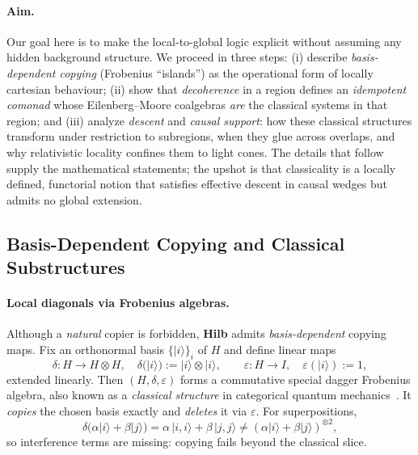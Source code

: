 \documentclass[11pt]{article}
\theoremstyle{upright}
\begin{document}
\paragraph{Aim.}
Our goal here is to make the local-to-global logic explicit without assuming any hidden background structure. We proceed in three steps: (i) describe \emph{basis-dependent copying} (Frobenius ``islands'') as the operational form of locally cartesian behaviour; (ii) show that \emph{decoherence} in a region defines an \emph{idempotent comonad} whose Eilenberg--Moore coalgebras \emph{are} the classical systems in that region; and (iii) analyze \emph{descent} and \emph{causal support}: how these classical structures transform under restriction to subregions, when they glue across overlaps, and why relativistic locality confines them to light cones. The details that follow supply the mathematical statements; the upshot is that classicality is a locally defined, functorial notion that satisfies effective descent in causal wedges but admits no global extension.

\subsection{Basis-Dependent Copying and Classical Substructures}

\paragraph{Local diagonals via Frobenius algebras.}
Although a \emph{natural} copier is forbidden, \textbf{Hilb} admits \emph{basis-dependent} copying maps. Fix an orthonormal basis $\{|i\rangle\}_i$ of $H$ and define linear maps
\begin{equation}\label{eq:basis-copy}
\delta : H \to H\otimes H, \quad \delta(|i\rangle) := |i\rangle \otimes |i\rangle,
\qquad
\varepsilon : H \to I, \quad \varepsilon(|i\rangle) := 1,
\end{equation}
extended linearly. Then $(H,\delta,\varepsilon)$ forms a commutative special dagger Frobenius algebra, also known as a \emph{classical structure} in categorical quantum mechanics~\cite{CoeckeKissinger2017}. It \emph{copies} the chosen basis exactly and \emph{deletes} it via $\varepsilon$. For superpositions,
\[
\delta\big(\alpha|i\rangle+\beta|j\rangle\big)
= \alpha\,|i,i\rangle + \beta\,|j,j\rangle
\neq (\alpha|i\rangle+\beta|j\rangle)^{\otimes 2},
\]
so interference terms are missing: copying fails beyond the classical slice. 
\end{document}
